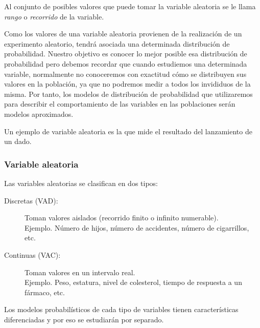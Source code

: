 \begin{frame}
{\begin{definicion}
Al conjunto de posibles valores que puede tomar la variable aleatoria se le llama \emph{rango} o \emph{recorrido} de la variable.
\end{definicion}

Como los valores de una variable aleatoria provienen de la realización de un experimento aleatorio, 
tendrá asociada una determinada distribución de probabilidad. Nuestro objetivo es conocer lo mejor posible esa distribución de probabilidad
pero debemos recordar que cuando estudiemos una determinada variable,
normalmente no conoceremos con exactitud cómo se distribuyen sus valores en la población, ya que no podremos medir a todos los invididuos de
la misma. Por tanto, los modelos de distribución de probabilidad que utilizaremos para describir el comportamiento de las variables en las
poblaciones serán modelos aproximados. 

Un ejemplo de variable aleatoria es la que mide el resultado del lanzamiento de un dado.
}
\end{frame}


\begin{frame}
\frametitle{Variable aleatoria}
Las variables aleatorias se clasifican en dos tipos:
\begin{description}
\item[Discretas (VAD):] Toman valores aislados (recorrido finito o infinito numerable).\\
Ejemplo. Número de hijos, número de accidentes, número de cigarrillos, etc. 
\item[Continuas (VAC):] Toman valores en un intervalo real.\\
Ejemplo. Peso, estatura, nivel de colesterol, tiempo de respuesta a un fármaco, etc. 
\end{description}

Los modelos probabilísticos de cada tipo de variables tienen características diferenciadas y por eso se estudiarán por separado. 

\end{frame}


